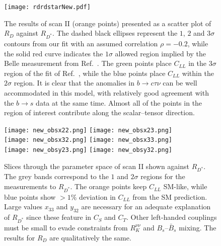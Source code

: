 \begin{figure}[t]
  \centering \texttt{[image: rdrdstarNew.pdf]}
  \caption[The results of scan II presented as a scatter plot of $R_D$ against
  $R_{D^*}$.]{The results of scan II (orange points) presented as a scatter plot
    of $R_D$ against $R_{D^*}$. The dashed black ellipses represent the $1$, $2$
    and $3\sigma$ contours from our fit with an assumed correlation
    $\rho = -0.2$, while the solid red curve indicates the $1\sigma$ allowed
    region implied by the Belle measurement from Ref.~\cite{Abdesselam:2019dgh}.
    The green points place $C_{LL}$ in the $3\sigma$ region of the fit of
    Ref.~\cite{Aebischer:2019mlg}, while the blue points place $C_{LL}$ within
    the $2\sigma$ region. It is clear that the anomalies in $b \to c \tau \nu$
    can be well accommodated in this model, with relatively good agreement with
    the $b \to s$ data at the same time. Almost all of the points in the region
    of interest contribute along the scalar--tensor direction.}
  \label{fig:ch3-money1}
\end{figure}

\begin{figure}
    \texttt{[image: new\_obsx22.png]} \hfill
    \texttt{[image: new\_obsx23.png]} \\
    \texttt{[image: new\_obsx32.png]} \hfill
    \texttt{[image: new\_obsx33.png]} \\
    \texttt{[image: new\_obsy23.png]} \hfill
    \texttt{[image: new\_obsy32.png]}
    \caption[Slices through the parameter space of scan II shown against
    $R_{D^{*}}$.]{Slices through the parameter space of scan II shown against
      $R_{D^{*}}$. The grey bands correspond to the $1$ and $2\sigma$ regions
      for the measurements to $R_{D^{*}}$. The orange points keep $C_{LL}$
      SM-like, while blue points show $> 1\%$ deviation in $C_{LL}$ from the SM
      prediction. Large values $x_{33}$ and $y_{32}$ are necessary for an
      adequate explanation of $R_{D^{*}}$ since these feature in $C_S$ and $C_T$.
      Other left-handed couplings must be small to evade constraints from
      $R_K^{\nu\nu}$ and $B_s$--$\bar{B}_s$ mixing. The results for $R_{D}$ are
      qualitatively the same.}
  \label{fig:ch3-ObsScans}
\end{figure}

